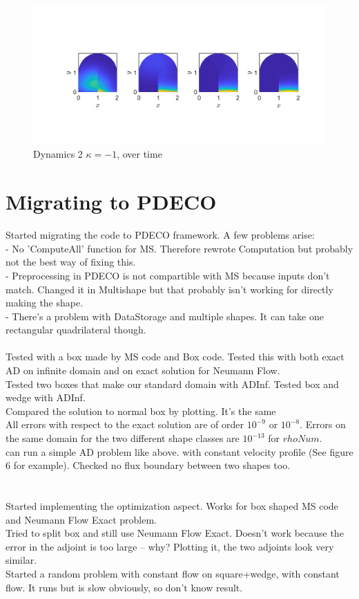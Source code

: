 \documentclass[11pt, a4paper]{article}
\theoremstyle{definition}
\begin{document}
   \begin{figure}[h]
	\centering
	\includegraphics[scale=0.35]{Dyn2kn1.png}
	\caption{Dynamics 2 $\kappa = -1$, over time} 
	\label{FDyn2kn1}
\end{figure}

\section{Migrating to PDECO}
Started migrating the code to PDECO framework.
A few problems arise:\\
- No 'ComputeAll' function for MS. Therefore rewrote Computation but probably not the best way of fixing this.\\
- Preprocessing in PDECO is not compartible with MS because inputs don't match. Changed it in Multishape but that probably isn't working for directly making the shape.\\
- There's a problem with DataStorage and multiple shapes. It can take one rectangular quadrilateral though.\\
\\
Tested with a box made by MS code and Box code. Tested this with both exact AD on infinite domain and on exact solution for Neumann Flow.\\
Tested two boxes that make our standard domain with ADInf. Tested box and wedge with ADInf.\\
Compared the solution to normal box by plotting. It's the same\\
All errors with respect to the exact solution are of order $10^{-9}$ or $10^{-8}$. Errors on the same domain for the two different shape classes are $10^{-13}$ for $rhoNum$.\\
can run a simple AD problem like above. with constant velocity profile (See figure 6 for example). Checked no flux boundary between two shapes too.\\
\\
\\
Started implementing the optimization aspect. Works for box shaped MS code and Neumann Flow Exact problem.\\
Tried to split box and still use Neumann Flow Exact. Doesn't work because the error in the adjoint is too large -- why? Plotting it, the two adjoints look very similar.\\
Started a random problem with constant flow on square+wedge, with constant flow. It runs but is slow obviously, so don't know result. 
\end{document}
